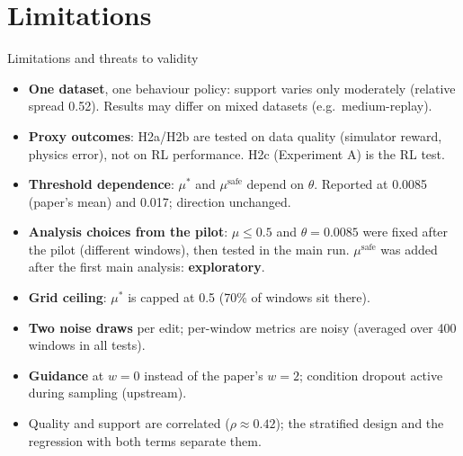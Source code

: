 \documentclass[aspectratio=169,11pt]{beamer}
\begin{document}
\section{Limitations}
\begin{frame}{Limitations and threats to validity}
\footnotesize
\begin{itemize}
\item \textbf{One dataset}, one behaviour policy: support varies only moderately (relative spread 0.52). Results may differ on mixed datasets (e.g.\ medium-replay).
\item \textbf{Proxy outcomes}: H2a/H2b are tested on data quality (simulator reward, physics error), not on RL performance. H2c (Experiment A) is the RL test.
\item \textbf{Threshold dependence}: $\mu^*$ and $\mu^{\text{safe}}$ depend on $\theta$. Reported at 0.0085 (paper's mean) and 0.017; direction unchanged.
\item \textbf{Analysis choices from the pilot}: $\mu\le0.5$ and $\theta=0.0085$ were fixed after the pilot (different windows), then tested in the main run. $\mu^{\text{safe}}$ was added after the first main analysis: \textbf{exploratory}.
\item \textbf{Grid ceiling}: $\mu^*$ is capped at 0.5 (70\% of windows sit there).
\item \textbf{Two noise draws} per edit; per-window metrics are noisy (averaged over 400 windows in all tests).
\item \textbf{Guidance} at $w=0$ instead of the paper's $w=2$; condition dropout active during sampling (upstream).
\item Quality and support are correlated ($\rho\approx0.42$); the stratified design and the regression with both terms separate them.
\end{itemize}
\end{frame}
\end{document}
